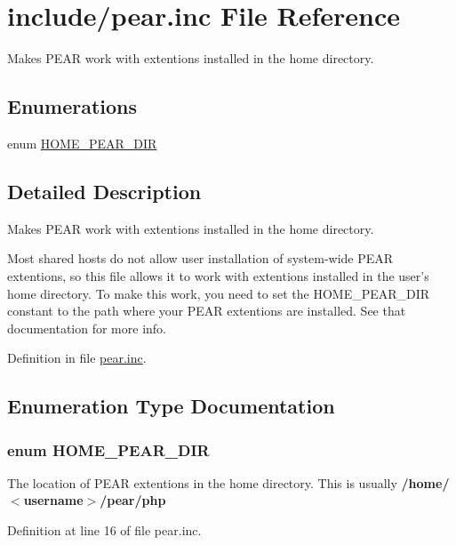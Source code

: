 \hypertarget{pear_8inc}{
\section{include/pear.inc File Reference}
\label{pear_8inc}
}
Makes PEAR work with extentions installed in the home directory. 

\subsection*{Enumerations}
\begin{CompactItemize}
\item 
enum \hyperlink{pear_8inc_d1f917c6039930c80bb1047ae2715e08}{HOME\_\-PEAR\_\-DIR} 
\end{CompactItemize}


\subsection{Detailed Description}
Makes PEAR work with extentions installed in the home directory. 

Most shared hosts do not allow user installation of system-wide PEAR extentions, so this file allows it to work with extentions installed in the user's home directory. To make this work, you need to set the HOME\_\-PEAR\_\-DIR constant to the path where your PEAR extentions are installed. See that documentation for more info. 

Definition in file \hyperlink{pear_8inc-source}{pear.inc}.

\subsection{Enumeration Type Documentation}
\hypertarget{pear_8inc_d1f917c6039930c80bb1047ae2715e08}{
\subsubsection{\setlength{\rightskip}{0pt plus 5cm}enum {\bf HOME\_\-PEAR\_\-DIR}}}
\label{pear_8inc_d1f917c6039930c80bb1047ae2715e08}


The location of PEAR extentions in the home directory. This is usually {\bf /home/$<$username$>$/pear/php} 

Definition at line 16 of file pear.inc.